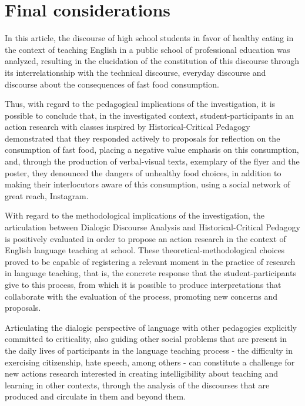 \documentclass[english]{textolivre}
\begin{document}
\section{Final considerations}

In this article, the discourse of high school students in favor of healthy eating in the context of teaching English in a public school of professional education was analyzed, resulting in the elucidation of the constitution of this discourse through its interrelationship with the technical discourse, everyday discourse and discourse about the consequences of fast food consumption.

Thus, with regard to the pedagogical implications of the investigation, it is possible to conclude that, in the investigated context, student-participants in an action research with classes inspired by Historical-Critical Pedagogy demonstrated that they responded actively to proposals for reflection on the consumption of fast food, placing a negative value emphasis on this consumption, and, through the production of verbal-visual texts, exemplary of the flyer and the poster, they denounced the dangers of unhealthy food choices, in addition to making their interlocutors aware of this consumption, using a social network of great reach, Instagram.

With regard to the methodological implications of the investigation, the articulation between Dialogic Discourse Analysis and Historical-Critical Pedagogy is positively evaluated in order to propose an action research in the context of English language teaching at school. These theoretical-methodological choices proved to be capable of registering a relevant moment in the practice of research in language teaching, that is, the concrete response that the student-participants give to this process, from which it is possible to produce interpretations that collaborate with the evaluation of the process, promoting new concerns and proposals.

Articulating the dialogic perspective of language with other pedagogies explicitly committed to criticality, also guiding other social problems that are present in the daily lives of participants in the language teaching process - the difficulty in exercising citizenship, hate speech, among others - can constitute a challenge for new actions research interested in creating intelligibility about teaching and learning in other contexts, through the analysis of the discourses that are produced and circulate in them and beyond them.
\end{document}
